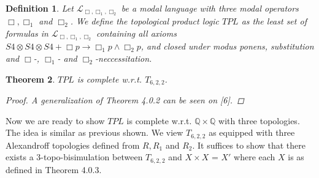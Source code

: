 \documentclass[12pt, a4paper]{scrartcl}
\newtheorem{definition}{Definition}[subsection]
\newtheorem{theorem}[definition]{Theorem}
\begin{document}
\begin{definition}
    Let $\mathcal{L}_{\Box,\Box_1,\Box_2}$ be a modal language with three modal operators $\Box, \Box_1$ and $\Box_2$.
    We define the topological product logic $TPL$ as the least set of formulas in $\mathcal{L}_{\Box,\Box_1,\Box_2}$ containing all axioms
    $S4 \otimes S4 \otimes S4 + \Box p \rightarrow \Box_1 p \land \Box_2 p$, and closed under modus ponens, substitution and $\Box$-, $\Box_1$- and $\Box_2$-neccessitation.  
\end{definition}

\begin{theorem}
    $TPL$ is complete w.r.t. $T_{6,2,2}$.
    \begin{proof}
        A generalization of Theorem 4.0.2 can be seen on [6].
    \end{proof}
\end{theorem}

Now we are ready to show $TPL$ is complete w.r.t. $\mathbb{Q} \times \mathbb{Q}$ with three topologies. The idea is similar as previous shown.
We view $T_{6,2,2}$ as equipped with three Alexandroff topologies defined from $R, R_1$ and $R_2$. It suffices to show 
that there exists a 3-topo-bisimulation between $T_{6,2,2}$ and $X \times X$ = $X'$ where each $X$ is as defined in Theorem 4.0.3. 
\end{document}

